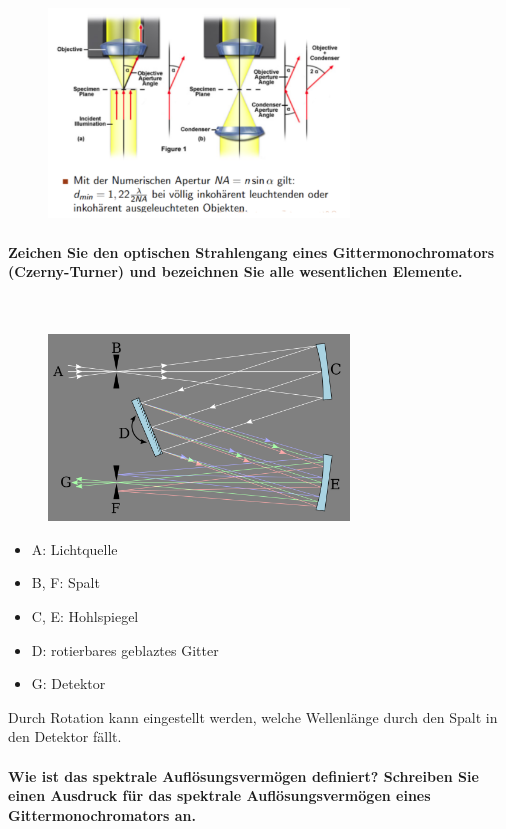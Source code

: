 \documentclass[a4paper, 11pt, ngerman, parskip=half-]{scrartcl}
\begin{document}
\begin{figure}[H]
    \centering
    \includegraphics[width=8cm]{image/22/opt25}
\end{figure}

\paragraph{Zeichen Sie den optischen Strahlengang eines Gittermonochromators (Czerny-Turner) und
    bezeichnen Sie alle wesentlichen Elemente.} ~

\begin{figure}[H]
    \centering
    \includegraphics[width=8cm]{image/22/Czerny-Turner.png}
\end{figure}
\begin{itemize}
    \item[] A: Lichtquelle
    \item[] B, F: Spalt
    \item[] C, E: Hohlspiegel
    \item[] D: rotierbares geblaztes Gitter
    \item[] G: Detektor
\end{itemize}
Durch Rotation kann eingestellt werden, welche Wellenlänge durch den Spalt in den Detektor fällt.
\paragraph{Wie ist das spektrale Auflösungsvermögen definiert? Schreiben Sie einen Ausdruck für das
    spektrale Auflösungsvermögen eines Gittermonochromators an.} ~
\end{document}
